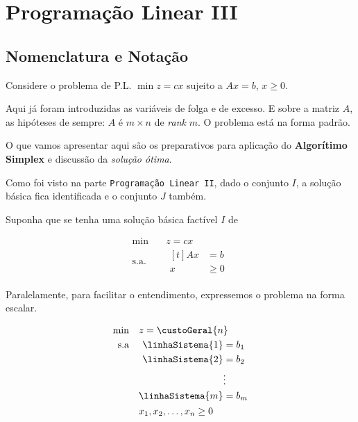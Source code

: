 
\chapter{Programação Linear III}

\section{Nomenclatura e Notação} %

Considere o problema de P.L. $ \min z = cx $ sujeito a $ Ax = b $, $ x \geq 0 $.

Aqui já foram introduzidas as variáveis de folga e de excesso.
E sobre a matriz $ A $, as hipóteses de sempre: $ A $ é $ m \times n $ de 
\textit{rank} $ m $.
O problema está na forma padrão.

O que vamos apresentar aqui são os preparativos para aplicação do 
\textbf{Algorítimo Simplex} e discussão da \textit{solução ótima}.

Como foi visto na parte \texttt{Programação Linear II}, dado o conjunto $ I $, a
solução básica fica identificada e o conjunto $ J $ também.

Suponha que se tenha uma solução básica factível $I$ de 

\begin{align*}
  \min \quad        & z = cx \\
  \text{s.a.} \quad & 
                      \begin{aligned}[t]
                        Ax &= b \\
                         x &\geq 0  
                      \end{aligned}
\end{align*}

Paralelamente, para facilitar o entendimento, expressemos o problema na forma 
escalar.

\begin{align*}
  \min \quad       & z = \custoGeral{n} \\
  \text{s.a} \quad & 
                     \begin{aligned}[t]
                       \linhaSistema{1} &= b_1 \\
                       \linhaSistema{2} &= b_2 \\
                                        &\vdots \\
                       \linhaSistema{m} &= b_m
                     \end{aligned}\\
                   & x_1, x_2, \dots, x_n \geq 0
\end{align*}

